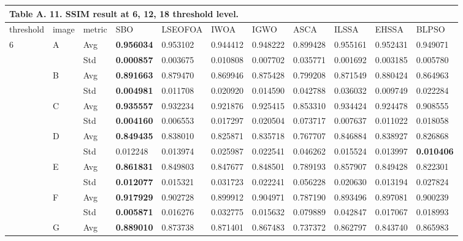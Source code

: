 \documentclass{article} %
\begin{document}
\begin{tabular}{|p{0.4in}|p{0.4in}|p{0.3in}|p{0.5in}|p{0.5in}|p{0.5in}|p{0.5in}|p{0.5in}|p{0.5in}|p{0.5in}|p{0.5in}|} \hline 
\multicolumn{11}{|p{1in}|}{\textbf{Table A. }11\textbf{.} SSIM result at 6, 12, 18 threshold level.} \\ \hline 
threshold & image & metric & SBO & LSEOFOA & IWOA & IGWO & ASCA & ILSSA & EHSSA & BLPSO \\ \hline 
6 & A & Avg & \textbf{0.956034 } & 0.953102  & 0.944412  & 0.948222  & 0.899428  & 0.955161  & 0.952431  & 0.949071  \\ \hline 
 &  & Std & \textbf{0.000857 } & 0.003675  & 0.010808  & 0.007702  & 0.035771  & 0.001692  & 0.003185  & 0.005780  \\ \hline 
 & B & Avg & \textbf{0.891663 } & 0.879470  & 0.869946  & 0.875428  & 0.799208  & 0.871549  & 0.880424  & 0.864963  \\ \hline 
 &  & Std & \textbf{0.004981 } & 0.011708  & 0.020920  & 0.014590  & 0.042788  & 0.036032  & 0.009749  & 0.022284  \\ \hline 
 & C & Avg & \textbf{0.935557 } & 0.932234  & 0.921876  & 0.925415  & 0.853310  & 0.934424  & 0.924478  & 0.908555  \\ \hline 
 &  & Std & \textbf{0.004160 } & 0.006553  & 0.017297  & 0.020504  & 0.073717  & 0.007637  & 0.011022  & 0.018058  \\ \hline 
 & D & Avg & \textbf{0.849435 } & 0.838010  & 0.825871  & 0.835718  & 0.767707  & 0.846884  & 0.838927  & 0.826868  \\ \hline 
 &  & Std & 0.012248  & 0.013974  & 0.025987  & 0.022541  & 0.046262  & 0.015524  & 0.013997  & \textbf{0.010406 } \\ \hline 
 & E & Avg & \textbf{0.861831 } & 0.849803  & 0.847677  & 0.848501  & 0.789193  & 0.857907  & 0.849428  & 0.822301  \\ \hline 
 &  & Std & \textbf{0.012077 } & 0.015321  & 0.031723  & 0.022241  & 0.056228  & 0.020630  & 0.013194  & 0.027824  \\ \hline 
 & F & Avg & \textbf{0.917929 } & 0.902728  & 0.899912  & 0.904971  & 0.787190  & 0.893496  & 0.897081  & 0.900239  \\ \hline 
 &  & Std & \textbf{0.005871 } & 0.016276  & 0.032775  & 0.015632  & 0.079889  & 0.042847  & 0.017067  & 0.018993  \\ \hline 
 & G & Avg & \textbf{0.889010 } & 0.873738  & 0.871401  & 0.867483  & 0.737372  & 0.862797  & 0.843740  & 0.865983  \\ \hline 

\end{tabular}
\end{document}
